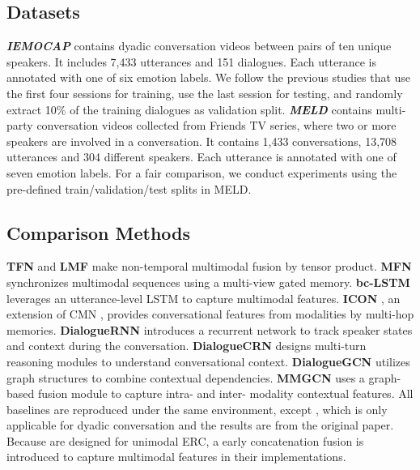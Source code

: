 \subsection{Datasets}
\textit{\textbf{IEMOCAP}} \cite{DBLP:journals/lre/BussoBLKMKCLN08} 
contains dyadic conversation videos between pairs of ten unique speakers. 
It includes 7,433 utterances and 151 dialogues. Each utterance is annotated with one of six emotion labels.
We follow the previous studies \cite{DBLP:conf/emnlp/GhosalMPCG19,DBLP:conf/acl/HuLZJ20} that use the first four sessions for training, use the last session for testing, and randomly extract 10\% of the training dialogues as validation split.
\textit{\textbf{MELD}}
\cite{DBLP:conf/acl/PoriaHMNCM19} 
contains multi-party conversation videos collected from Friends TV series, where two or more speakers are involved in a conversation. 
It contains 1,433 conversations, 13,708 utterances and 304 different speakers. Each utterance is annotated with one of seven emotion labels.
For a fair comparison, we conduct experiments using the pre-defined train/validation/test splits in MELD.

\subsection{Comparison Methods}

\textbf{TFN} \cite{DBLP:conf/emnlp/ZadehCPCM17} and \textbf{LMF} \cite{DBLP:conf/acl/MorencyLZLSL18} 
make non-temporal multimodal fusion by tensor product.
\textbf{MFN} \cite{DBLP:conf/aaai/ZadehLMPCM18} synchronizes multimodal sequences using a multi-view gated memory.
\textbf{bc-LSTM} \cite{DBLP:conf/acl/PoriaCHMZM17} leverages an utterance-level LSTM to capture multimodal features. %
\textbf{ICON} \cite{DBLP:conf/emnlp/HazarikaPMCZ18}, an extension of CMN \cite{DBLP:conf/naacl/HazarikaPZCMZ18}, provides conversational features from modalities by multi-hop memories.
\textbf{DialogueRNN} \cite{DBLP:conf/aaai/MajumderPHMGC19}  
introduces a recurrent network to track speaker states and context during the conversation.
\textbf{DialogueCRN} \cite{DBLP:conf/acl/HuWH20} designs multi-turn reasoning modules to understand conversational context. %
\textbf{DialogueGCN} \cite{DBLP:conf/emnlp/GhosalMPCG19} utilizes graph structures to combine contextual dependencies.
\textbf{MMGCN} \cite{DBLP:conf/acl/HuLZJ20} uses a graph-based fusion module to capture intra- and inter- modality contextual features.
All baselines are reproduced under the same environment, except \cite{DBLP:conf/emnlp/HazarikaPMCZ18}, which is only applicable for dyadic conversation and the results are from the original paper. %
Because \cite{DBLP:conf/aaai/MajumderPHMGC19,DBLP:conf/emnlp/GhosalMPCG19,DBLP:conf/acl/HuWH20} are designed for unimodal ERC, 
a early concatenation fusion is introduced to capture multimodal features in their implementations. %
  
